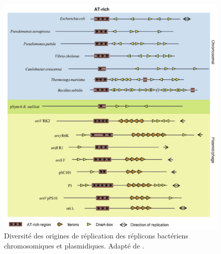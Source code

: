 \begin{figure}[H]
		\begin{center}
			\includegraphics[height=0.5\textheight]{./img/ori_diversite.png}
			\caption[Diversité structurale des origines de réplication chez les bactéries]{Diversité des origines de réplication des réplicons bactériens chromosomiques et plasmidiques. Adapté de \citep{rajewska2012rich}. }\label{ori_div}
		\end{center}
\end{figure} 

